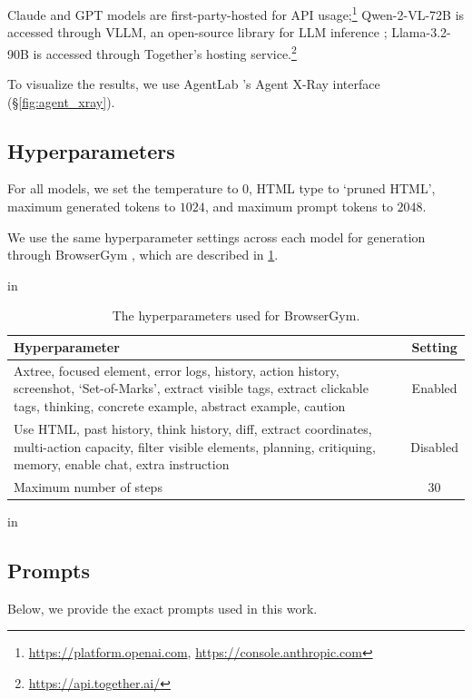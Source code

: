 Claude and GPT models are first-party-hosted for API usage;\footnote{\href{https://platform.openai.com}{https://platform.openai.com}, \href{https://console.anthropic.com}{https://console.anthropic.com}} Qwen-2-VL-72B is accessed through VLLM, an open-source library for LLM inference \cite{kwon2023efficient}; Llama-3.2-90B is accessed through Together's hosting service.\footnote{\href{https://api.together.ai/}{https://api.together.ai/}}

To visualize the results, we use AgentLab \citep{chezelles_browsergym_2024}'s Agent X-Ray interface (\S\ref{fig:agent_xray}).

\subsection{Hyperparameters}
\label{sec:hyper}
For all models, we set the temperature to $0$, HTML type to `pruned HTML', maximum generated tokens to $1024$, and maximum prompt tokens to $2048$.

We use the same hyperparameter settings across each model for generation through BrowserGym \citep{chezelles_browsergym_2024}, which are described in \cref{tab:browsergym_hyperparam_settings}.

\begin{table}[ht]
    \centering
    \renewcommand{\arraystretch}{1.5}
    \caption{The hyperparameters used for BrowserGym.}
    \label{tab:browsergym_hyperparam_settings}
     in
    \begin{tabular}{p{13cm}c}
        \toprule
        \textbf{Hyperparameter} & \textbf{Setting} \\ 
        \midrule
        Axtree,  focused element,  error logs,  history,  action history,  screenshot,  `Set-of-Marks', extract visible tags, extract clickable tags, thinking,  concrete example,  abstract example,  caution & Enabled \\ 
        \midrule
        Use HTML,  past history,  think history,  diff, extract coordinates, multi-action capacity, filter visible elements, planning, critiquing, memory, enable chat, extra instruction & Disabled \\ 
        \midrule
        Maximum number of steps & $30$ \\
        \bottomrule
    \end{tabular}
     in
    \renewcommand{\arraystretch}{1}
\end{table}



\subsection{Prompts}
\label{sec:prompts}
Below, we provide the exact prompts used in this work.

